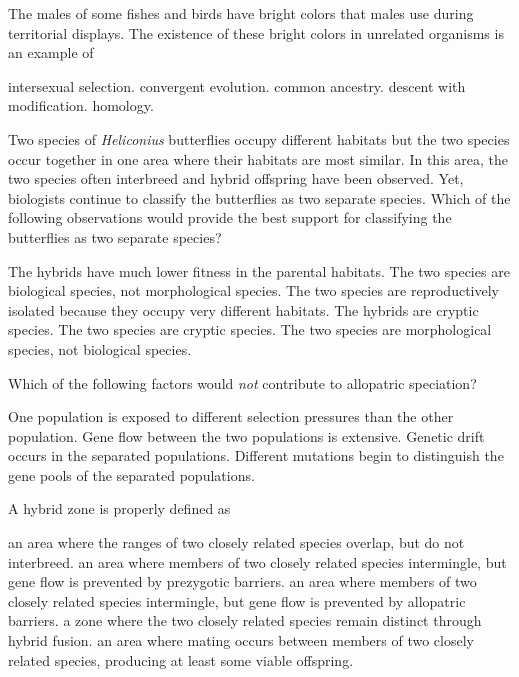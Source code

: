 
\question
The males of some fishes and birds have bright colors that males use during territorial displays. The existence of these bright colors in unrelated organisms is an example of 

\begin{choices}
\choice intersexual selection. 
\correctchoice convergent evolution. 
\choice common ancestry. 
\choice descent with modification. 
\choice homology. 
\end{choices}

\question
Two species of \textit{Heliconius} butterflies occupy different habitats but the two species occur together in one area where their habitats are most similar. In this area, the two species often interbreed and hybrid offspring have been observed.  Yet, biologists continue to classify the butterflies as two separate species.  Which of the following observations would provide the best support for classifying the butterflies as two separate species? 

\begin{choices}
\correctchoice The hybrids have much lower fitness in the parental habitats.
\choice The two species are biological species, not morphological species.
\choice The two species are reproductively isolated because they occupy very different habitats.
\choice The hybrids are cryptic species.
\choice The two species are cryptic species.
\choice The two species are morphological species, not biological species.
\end{choices}

\newpage

\question
Which of the following factors would \emph{not} contribute to allopatric speciation?

\begin{choices}
\choice One population is exposed to different selection pressures than the other population.   
\correctchoice Gene flow between the two populations is extensive.   
\choice Genetic drift occurs in the separated populations.   
\choice Different mutations begin to distinguish the gene pools of the separated populations.   
\end{choices}

\question
A hybrid zone is properly defined as 

\begin{choices}
\choice an area where the ranges of two closely related species overlap, but do not interbreed. 
\choice an area where members of two closely related species intermingle, but gene flow is prevented by prezygotic barriers. 
\choice an area where members of two closely related species intermingle, but gene flow is prevented by allopatric barriers. 
\choice a zone where the two closely related species remain distinct through hybrid fusion. 
\correctchoice an area where mating occurs between members of two closely related species, producing at least some viable offspring. 
\end{choices}

